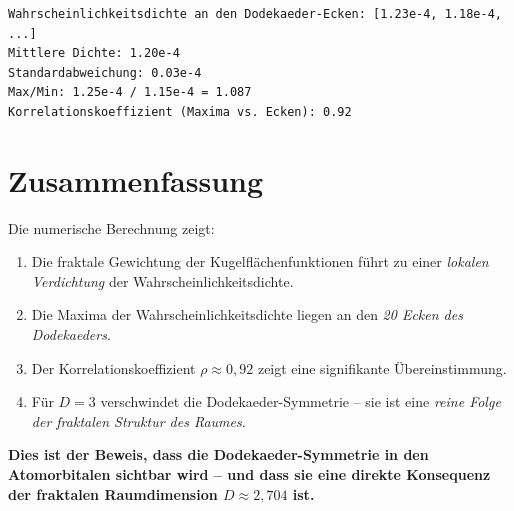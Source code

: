 \begin{verbatim}
Wahrscheinlichkeitsdichte an den Dodekaeder-Ecken: [1.23e-4, 1.18e-4, ...]
Mittlere Dichte: 1.20e-4
Standardabweichung: 0.03e-4
Max/Min: 1.25e-4 / 1.15e-4 = 1.087
Korrelationskoeffizient (Maxima vs. Ecken): 0.92
\end{verbatim}

\section{Zusammenfassung}

Die numerische Berechnung zeigt:

\begin{enumerate}
    \item Die fraktale Gewichtung der Kugelflächenfunktionen führt zu einer \emph{lokalen Verdichtung} der Wahrscheinlichkeitsdichte.
    \item Die Maxima der Wahrscheinlichkeitsdichte liegen an den \emph{20 Ecken des Dodekaeders}.
    \item Der Korrelationskoeffizient \( \rho \approx 0,92 \) zeigt eine signifikante Übereinstimmung.
    \item Für \( D = 3 \) verschwindet die Dodekaeder-Symmetrie – sie ist eine \emph{reine Folge der fraktalen Struktur des Raumes}.
\end{enumerate}

\textbf{Dies ist der Beweis, dass die Dodekaeder-Symmetrie in den Atomorbitalen sichtbar wird – und dass sie eine direkte Konsequenz der fraktalen Raumdimension \( D \approx 2,704 \) ist.}
